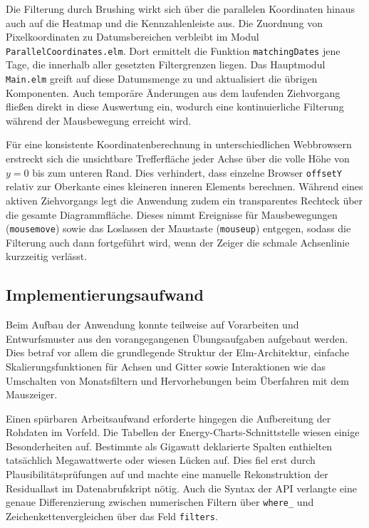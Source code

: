 Die Filterung durch Brushing wirkt sich über die parallelen Koordinaten hinaus auch auf die Heatmap und die Kennzahlenleiste aus. Die Zuordnung von Pixelkoordinaten zu Datumsbereichen verbleibt im Modul \texttt{ParallelCoordinates.elm}. Dort ermittelt die Funktion \texttt{matchingDates} jene Tage, die innerhalb aller gesetzten Filtergrenzen liegen. Das Hauptmodul \texttt{Main.elm} greift auf diese Datumsmenge zu und aktualisiert die übrigen Komponenten. Auch temporäre Änderungen aus dem laufenden Ziehvorgang fließen direkt in diese Auswertung ein, wodurch eine kontinuierliche Filterung während der Mausbewegung erreicht wird.

Für eine konsistente Koordinatenberechnung in unterschiedlichen Webbrowsern erstreckt sich die unsichtbare Trefferfläche jeder Achse über die volle Höhe von $y = 0$ bis zum unteren Rand. Dies verhindert, dass einzelne Browser \texttt{offsetY} relativ zur Oberkante eines kleineren inneren Elements berechnen. Während eines aktiven Ziehvorgangs legt die Anwendung zudem ein transparentes Rechteck über die gesamte Diagrammfläche. Dieses nimmt Ereignisse für Mausbewegungen (\texttt{mousemove}) sowie das Loslassen der Maustaste (\texttt{mouseup}) entgegen, sodass die Filterung auch dann fortgeführt wird, wenn der Zeiger die schmale Achsenlinie kurzzeitig verlässt.

\subsection*{Implementierungsaufwand}

Beim Aufbau der Anwendung konnte teilweise auf Vorarbeiten und Entwurfsmuster aus den vorangegangenen Übungsaufgaben aufgebaut werden. Dies betraf vor allem die grundlegende Struktur der Elm-Architektur, einfache Skalierungsfunktionen für Achsen und Gitter sowie Interaktionen wie das Umschalten von Monatsfiltern und Hervorhebungen beim Überfahren mit dem Mauszeiger.

Einen spürbaren Arbeitsaufwand erforderte hingegen die Aufbereitung der Rohdaten im Vorfeld. Die Tabellen der Energy-Charts-Schnittstelle wiesen einige Besonderheiten auf. Bestimmte als Gigawatt deklarierte Spalten enthielten tatsächlich Megawattwerte oder wiesen Lücken auf. Dies fiel erst durch Plausibilitätsprüfungen auf und machte eine manuelle Rekonstruktion der Residuallast im Datenabrufskript nötig. Auch die Syntax der API verlangte eine genaue Differenzierung zwischen numerischen Filtern über \texttt{where\_} und Zeichenkettenvergleichen über das Feld \texttt{filters}.


